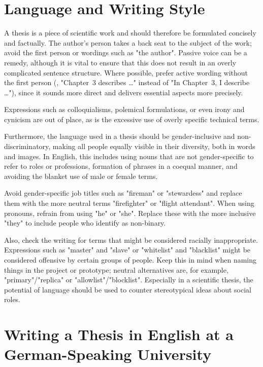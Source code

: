 \section{Language and Writing Style}

A thesis is a piece of scientific work and should therefore be formulated concisely 
and factually. The author's person takes a back seat to the subject of the
work; avoid the first person or wordings such as "the author". Passive voice can
be a remedy, although it is vital to ensure that this does not result in an
overly complicated sentence structure. Where possible, prefer active wording
without the first person (\eg, "Chapter~3 describes \ldots" instead of "In
Chapter~3, I describe \ldots"), since it sounds more direct and delivers
essential aspects more precisely.

Expressions such as colloquialisms, polemical formulations, or even irony and
cynicism are out of place, as is the excessive use of overly specific technical
terms.

Furthermore, the language used in a thesis should be gender-inclusive and
non-discri\-minatory, making all people equally visible in their diversity,
both in words and images. In English, this includes using nouns that are not
gender-specific to refer to roles or professions, formation of phrases in a
coequal manner, and avoiding the blanket use of male or female terms.

Avoid gender-specific job titles such as "fireman" or "stewardess" and replace
them with the more neutral terms "firefighter" or "flight attendant". When
using pronouns, refrain from using "he" or "she". Replace these with the more
inclusive "they" to include people who identify as non-binary.

Also, check the writing for terms that might be considered racially
inappropriate. Expressions such as "master" and "slave" or "whitelist" and
"blacklist" might be considered offensive by certain groups of people. Keep this
in mind when naming things in the project or prototype; neutral alternatives
are, for example, "primary"/"replica" or "allowlist"/"blocklist". Especially in a
scientific thesis, the potential of language should be used to counter
stereotypical ideas about social roles.


\section{Writing a Thesis in English at a German-Speaking University}
\label{sec:german}


